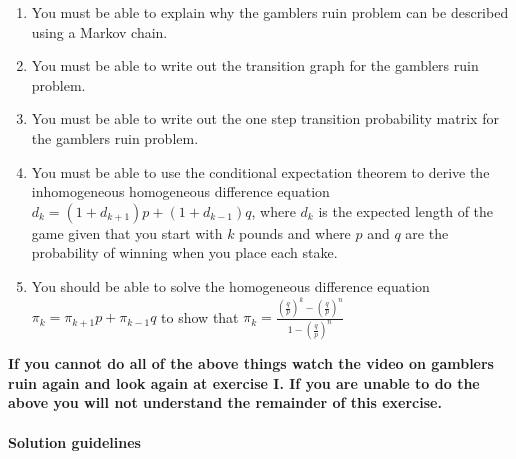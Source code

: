 \documentclass[a4paper]{article}
\begin{document}
\begin{enumerate}
 \item You must be able to explain why the gamblers ruin problem can be described using a Markov chain.
 \item You must be able to write out the transition graph for the gamblers ruin problem.
 \item You must be able to write out the one step transition probability matrix for the gamblers ruin problem.
 \item You must be able to use the conditional expectation theorem to derive the inhomogeneous homogeneous difference equation $d_k = (1+d_{k+1})p + (1 + d_{k-1})q$, where $d_k$ is the
expected length of the game given that you start with $k$ pounds and where $p$ and $q$ are the probability of winning when you place each stake.
\item You should be able to solve the homogeneous difference equation $\pi_k = \pi_{k+1} p + \pi_{k-1} q$ to show that $\pi_k = \frac{ \left( \frac{q}{p} \right)^k - \left( \frac{q}{p} 
\right)^n }{ 1 - \left( \frac{q}{p} \right)^n }$
\end{enumerate}

{\bf If you cannot do all of the above things watch the video on gamblers ruin again and look again at exercise I.  If you are unable to do the above you will not understand the remainder of this
exercise.}


\paragraph{Solution guidelines}
\end{document}
